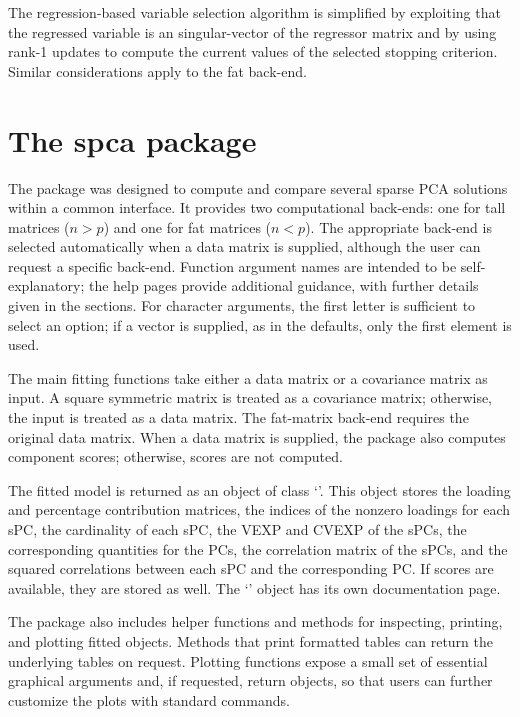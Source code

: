 \documentclass[article]{jss}
\newcommand{\class}[1]{`\code{#1}'}
\begin{document}
The regression-based variable selection algorithm is simplified by exploiting that the regressed variable is an singular-vector of the regressor matrix and by using rank-1 updates to compute the current values of the selected stopping criterion. Similar considerations apply to the fat back-end.

\section{The spca package}
The  package was designed to compute and compare several sparse PCA solutions within a common interface. It provides two computational back-ends: one for tall matrices ($n > p$) and one for fat matrices ($n < p$). The appropriate back-end is selected automatically when a data matrix is supplied, although the user can request a specific back-end. Function argument names are intended to be self-explanatory; the help pages provide additional guidance, with further details given in the  sections. For character arguments, the first letter is sufficient to select an option; if a vector is supplied, as in the defaults, only the first element is used.

The main fitting functions take either a data matrix or a covariance matrix as input. A square symmetric matrix is treated as a covariance matrix; otherwise, the input is treated as a data matrix. The fat-matrix back-end requires the original data matrix. When a data matrix is supplied, the package also computes component scores; otherwise, scores are not computed.

The fitted model is returned as an object of class \class{spca}. This object stores the loading and percentage contribution matrices, the indices of the nonzero loadings for each sPC, the cardinality of each sPC, the VEXP and CVEXP of the sPCs, the corresponding quantities for the PCs, the correlation matrix of the sPCs, and the squared correlations  between each sPC and the corresponding PC. If scores are available, they are stored as well. The \class{spca} object has its own documentation page.

The package also includes helper functions and methods for inspecting, printing, and plotting fitted objects. Methods that print formatted tables can return the underlying tables on request. Plotting functions expose a small set of essential graphical arguments and, if requested, return  objects, so that users can further customize the plots with standard  commands.
\end{document}
